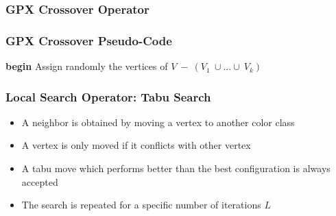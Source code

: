 \documentclass{beamer}
\begin{document}
\begin{frame}
\frametitle{GPX Crossover Operator}
\end{frame}

\begin{frame}
\frametitle{GPX Crossover Pseudo-Code}
\begin{algorithm}[H]
{\bf begin}\;
Assign randomly the vertices of $V\ -\ (V_1\ \cup ... \cup\ V_k)$\;
\end{algorithm}
\end{frame}

\begin{frame}

\frametitle{Local Search Operator: Tabu Search}

\begin{itemize}

\item A neighbor is obtained by moving a vertex to another color class
\item A vertex is only moved if it conflicts with other vertex
\item A tabu move which performs better than the best configuration is always accepted
\item The search is repeated for a specific number of iterations $L$

\end{itemize}

\end{frame}
\end{document}
